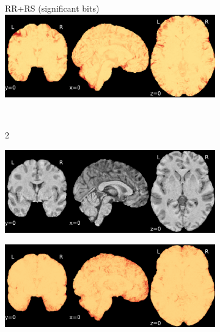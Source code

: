 \documentclass{article}
\begin{document}
\begin{appendices}
\begin{landscape}
\begin{figure}
\begin{subfigure}[t]{0.2\paperheight}
            \end{subfigure}
            \begin{subfigure}[t]{0.2\paperheight}
                \centering
                RR+RS (significant bits)
                \includegraphics[width=\textwidth]{figures/sig/0mm/rs_ds001600_sub-1_sig.pdf}
            \end{subfigure} \\
            \begin{subfigure}[b][][c]{0.01\paperwidth} 2 \vspace*{15pt} \end{subfigure}
            \begin{subfigure}[t]{0.2\paperheight}
                \centering
                \includegraphics[width=\textwidth]{figures/sig/0mm/ieee_ds001771_sub-36.pdf}
            \end{subfigure}
            \begin{subfigure}[t]{0.2\paperheight}
                \centering
                \includegraphics[width=\textwidth]{figures/sig/0mm/rr_ds001771_sub-36_sig.pdf}

\end{subfigure}
\end{figure}
\end{landscape}
\end{appendices}
\end{document}
